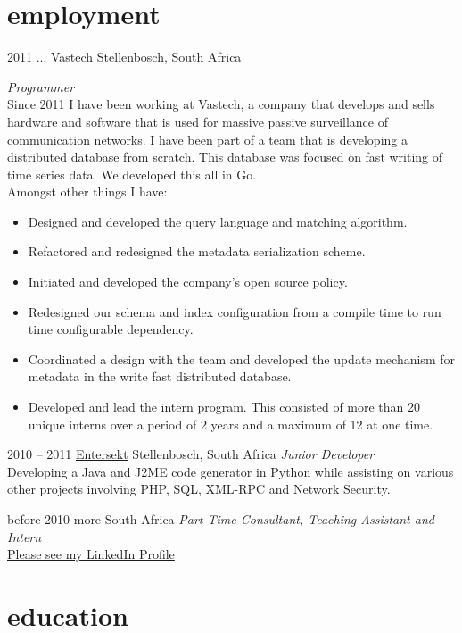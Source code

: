 \documentclass[print]{friggeri-cv} %
\begin{document}
\section{employment}
\begin{entrylist}

\entry
{2011 ...}
{Vastech}
{Stellenbosch, South Africa}
{\emph{Programmer} \\
Since 2011 I have been working at Vastech, a company that develops and sells hardware and software that is used for massive passive surveillance of communication networks. I have been part of a team that is developing a distributed database from scratch. This database was focused on fast writing of time series data.  We developed this all in Go. \\
Amongst other things I have: \\
\begin{itemize}
\item Designed and developed the query language and matching algorithm.
\item Refactored and redesigned the metadata serialization scheme.
\item Initiated and developed the company's open source policy.
\item Redesigned our schema and index configuration from a compile time to run time configurable dependency.
\item Coordinated a design with the team and developed the update mechanism for metadata in the write fast distributed database.
\item Developed and lead the intern program. This consisted of more than 20 unique interns over a period of 2 years and a maximum of 12 at one time.
\end{itemize}
}

\entry
{2010 -- 2011}
{\href{https://www.entersekt.com/}{Entersekt}}
{Stellenbosch, South Africa}
{\emph{Junior Developer} \\
Developing a Java and J2ME code generator in Python while assisting on various other projects involving PHP, SQL, XML-RPC and Network Security.}

\entry
{before 2010}
{more}
{South Africa}
{\emph{Part Time Consultant, Teaching Assistant and Intern} \\
\href{https://za.linkedin.com/in/schulzewalter}{Please see my LinkedIn Profile}
}

\end{entrylist}

\section{education}
\end{document}
